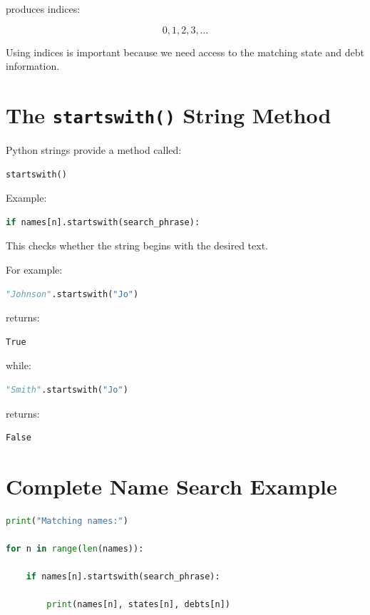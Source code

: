 \documentclass[11pt]{article}
\begin{document}
produces indices:

\[
0, 1, 2, 3, \ldots
\]

Using indices is important because we need access to the matching state and debt information.

\section{The \texttt{startswith()} String Method}

Python strings provide a method called:

\begin{lstlisting}[language=Python]
startswith()
\end{lstlisting}

Example:

\begin{lstlisting}[language=Python]
if names[n].startswith(search_phrase):
\end{lstlisting}

This checks whether the string begins with the desired text.

For example:

\begin{lstlisting}[language=Python]
"Johnson".startswith("Jo")
\end{lstlisting}

returns:

\begin{lstlisting}
True
\end{lstlisting}

while:

\begin{lstlisting}[language=Python]
"Smith".startswith("Jo")
\end{lstlisting}

returns:

\begin{lstlisting}
False
\end{lstlisting}

\section{Complete Name Search Example}

\begin{lstlisting}[language=Python]
print("Matching names:")

for n in range(len(names)):

    if names[n].startswith(search_phrase):

        print(names[n], states[n], debts[n])
\end{lstlisting}
\end{document}
